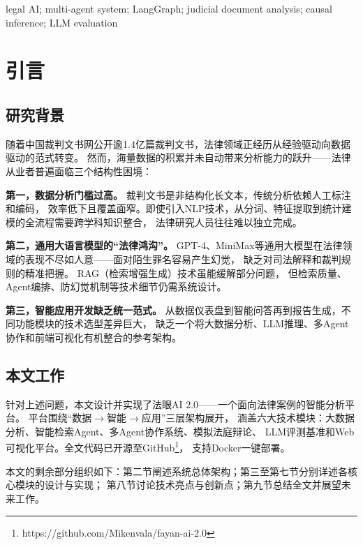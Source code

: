 \documentclass[12pt,a4paper,twoside]{ctexart}
\begin{document}
\vspace{6pt}
 legal AI; multi-agent system; LangGraph; judicial
document analysis; causal inference; LLM evaluation

\newpage
\setcounter{page}{1}

\section{引言}

\subsection{研究背景}

随着中国裁判文书网公开逾1.4亿篇裁判文书\cite{wang2019}，法律领域正经历从经验驱动向数据驱动的范式转变。
然而，海量数据的积累并未自动带来分析能力的跃升——法律从业者普遍面临三个结构性困境：

\textbf{第一，数据分析门槛过高。} 裁判文书是非结构化长文本，传统分析依赖人工标注和编码，
效率低下且覆盖面窄。即使引入NLP技术，从分词、特征提取到统计建模的全流程需要跨学科知识整合，
法律研究人员往往难以独立完成\cite{zuo2018}。

\textbf{第二，通用大语言模型的``法律鸿沟''。}
GPT-4、MiniMax等通用大模型在法律领域的表现不尽如人意——面对陌生罪名容易产生幻觉，
缺乏对司法解释和裁判规则的精准把握\cite{cui2023}。
RAG（检索增强生成）技术虽能缓解部分问题，
但检索质量、Agent编排、防幻觉机制等技术细节仍需系统设计\cite{lewis2020}。

\textbf{第三，智能应用开发缺乏统一范式。}
从数据仪表盘到智能问答再到报告生成，不同功能模块的技术选型差异巨大，
缺乏一个将大数据分析、LLM推理、多Agent协作和前端可视化有机整合的参考架构。

\subsection{本文工作}

针对上述问题，本文设计并实现了法眼AI 2.0——一个面向法律案例的智能分析平台。
平台围绕``数据$\rightarrow$智能$\rightarrow$应用''三层架构展开，
涵盖六大技术模块：大数据分析、智能检索Agent、多Agent协作系统、模拟法庭辩论、
LLM评测基准和Web可视化平台。全文代码已开源至GitHub\footnote{https://github.com/Mikenvala/fayan-ai-2.0}，
支持Docker一键部署。

本文的剩余部分组织如下：第二节阐述系统总体架构；第三至第七节分别详述各核心模块的设计与实现；
第八节讨论技术亮点与创新点；第九节总结全文并展望未来工作。
\end{document}

